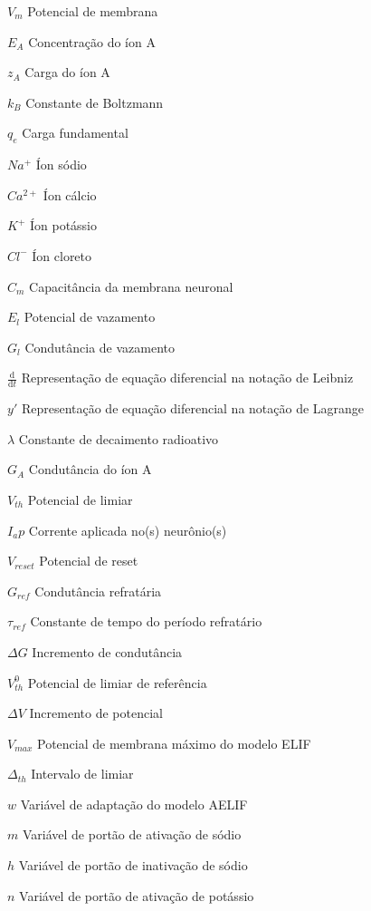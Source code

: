 \documentclass[
	12pt,				%
	openright,			%
	oneside,			%
	a4paper,			%
	chapter=TITLE,		%
	english,			%
	french,				%
	spanish,			%
	brazil				%
	]{abntex2}
\theoremstyle{definition}
\begin{document}
\begin{simbolos}
\item[$V_m$] Potencial de membrana
\item[$E_A$] Concentração do íon A
\item[$z_A$] Carga do íon A
\item[$k_B$] Constante de Boltzmann
\item[$q_e$] Carga fundamental
\item[$Na^+$] Íon sódio
\item[$Ca^{2+}$] Íon cálcio
\item[$K^+$] Íon potássio
\item[$Cl^-$] Íon cloreto
\item[$C_m$] Capacitância da membrana neuronal
\item[$E_l$] Potencial de vazamento
\item[$G_l$] Condutância de vazamento
\item[$\frac{\mathrm{d}}{\mathrm{d}t}$] Representação de equação diferencial na notação de Leibniz
\item[$y'$] Representação de equação diferencial na notação de Lagrange
\item[$\lambda$] Constante de decaimento radioativo
\item[$G_A$] Condutância do íon A
\item[$V_{th}$] Potencial de limiar
\item[$I_ap$] Corrente aplicada no(s) neurônio(s)
\item[$V_{reset}$] Potencial de reset
\item[$G_{ref}$] Condutância refratária
\item[$\tau_{ref}$] Constante de tempo do período refratário
\item[$\Delta G$] Incremento de condutância
\item[$V_{th}^0$] Potencial de limiar de referência
\item[$\Delta V$] Incremento de potencial
\item[$V_{max}$] Potencial de membrana máximo do modelo ELIF
\item[$\Delta_{th}$] Intervalo de limiar
\item[$w$] Variável de adaptação do modelo AELIF
\item[$m$] Variável de portão de ativação de sódio
\item[$h$] Variável de portão de inativação de sódio
\item[$n$] Variável de portão de ativação de potássio

\end{simbolos}
\end{document}
